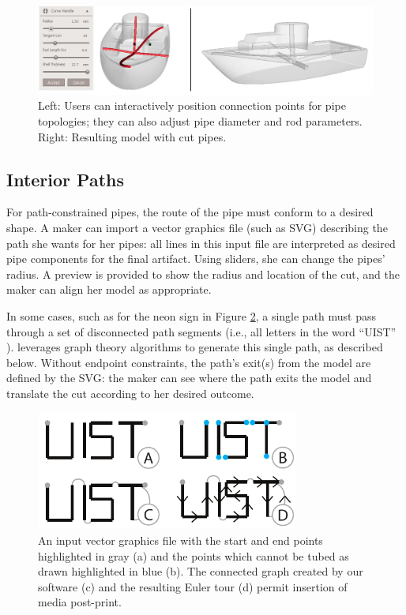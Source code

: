 \begin{figure}[b]
\centering
    \includegraphics[width=1.0\columnwidth]{figures/boat-star.png}
\caption{Left: Users can interactively position connection points for pipe topologies; they can also adjust pipe diameter and rod parameters. Right: Resulting model with cut pipes.}
\label{fig:boat-star}
\end{figure}

\subsection{Interior Paths}

For path-constrained pipes, the route of the pipe must conform to a desired shape. A maker can import a vector graphics file (such as SVG) describing the path she wants for her pipes: all lines in this input file are interpreted as desired pipe components for the final artifact.  Using sliders, she can change the pipes' radius.  A preview is provided to show the radius and location of the cut, and the maker can align her model as appropriate.

In some cases, such as for the neon sign in Figure \ref{fig:tool-process-interior}, a single path must pass through a set of disconnected path segments (i.e., all letters in the word ``UIST'' ).  \systemname leverages graph theory algorithms to generate this single path, as described below.  Without endpoint constraints, the path's exit(s) from the model are defined by the SVG: the maker can see where the path exits the model and translate the cut according to her desired outcome.

\begin{figure}[h!]
\centering
    \includegraphics[width=3.4in]{figures/interior.pdf}
\caption{An input vector graphics file with the start and end points highlighted in {\color{gray}gray} (a) and the points which cannot be tubed as drawn highlighted in {\color{blue}blue} (b).  The connected graph created by our software (c) and the resulting Euler tour (d) permit insertion of media post-print.}
\label{fig:tool-process-interior}
\end{figure}

